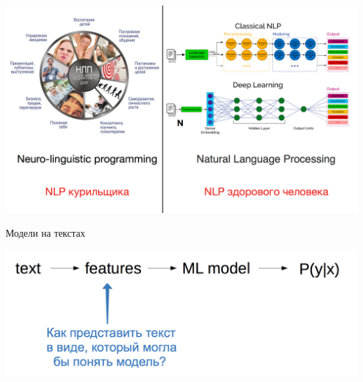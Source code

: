 \documentclass[notes,12pt, aspectratio=169]{beamer}
\begin{document}
{
	\begin{frame}
\end{frame}
}


\begin{frame}
\begin{center}
\includegraphics[width=0.8\paperwidth]{nlp5.png}
\end{center}
\end{frame}


\begin{frame}{Модели на текстах }
\begin{center}
	\includegraphics[width=.8\linewidth]{text1.png}
\end{center}
\end{frame} 
\end{document}

